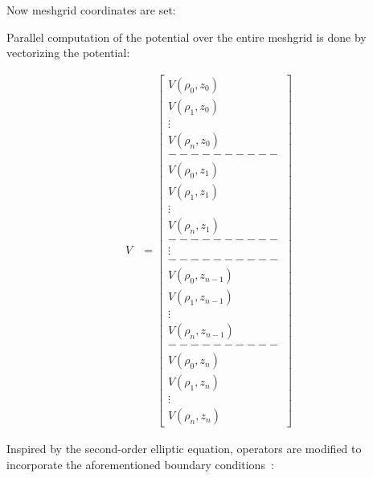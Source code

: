 Now meshgrid coordinates are set:



\newpage

Parallel computation of the potential over the entire meshgrid is done by vectorizing the potential:

\[ 
 \begin{aligned}
    V &= \begin{bmatrix}
           V(\rho_0, z_0) \\
           V(\rho_1, z_0) \\
           \vdots \\
	   V(\rho_n, z_0) \\
	   ---------- \\
	   V(\rho_0, z_1) \\
           V(\rho_1, z_1) \\
           \vdots \\
	   V(\rho_n, z_1) \\
	   ---------- \\
	   \vdots \\
	   ---------- \\
	   V(\rho_0, z_{n-1}) \\
           V(\rho_1, z_{n-1}) \\
           \vdots \\
           V(\rho_n, z_{n-1}) \\
           ---------- \\
           V(\rho_0, z_n) \\
	   V(\rho_1, z_n) \\
	   \vdots \\
	   V(\rho_n, z_n) 
         \end{bmatrix}
  \end{aligned}
\]

\newpage
\noindent Inspired by the second-order elliptic equation, operators are modified to incorporate the aforementioned boundary conditions~\cite{Press:2007}:

